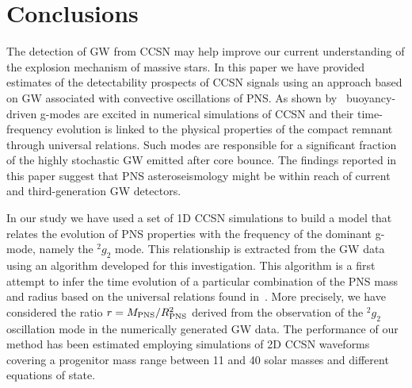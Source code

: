 \section{Conclusions}
\label{sec:conclusion}

The detection of GW from CCSN may help improve our current understanding of the explosion mechanism of massive stars.  
In this paper we have provided estimates of the detectability prospects of CCSN signals using an approach based on GW associated with convective oscillations of PNS. As shown by~\cite{Torres:2019b} buoyancy-driven g-modes are excited in numerical simulations of CCSN and their time-frequency evolution is linked to the physical properties of the compact remnant through universal relations. Such modes are responsible for a significant fraction of the highly stochastic GW emitted after core bounce. The findings reported in this paper suggest that PNS asteroseismology might be within reach of current and third-generation GW detectors.

In our study we have used a set of 1D CCSN simulations to build a model that relates the  evolution of PNS properties with the frequency of the dominant g-mode, namely the $\mbox{}^2g_2$ mode. This relationship is extracted from the GW data using an algorithm developed for this investigation. This algorithm is  a first attempt to infer the time evolution of a particular combination of the PNS mass and radius based on the universal relations found in~\cite{Torres:2019b}. More precisely, we have considered the ratio $r=M_{\rm PNS}/R_{\rm PNS}^2$ derived from the observation of the $\mbox{}^2g_2$ oscillation mode in the numerically generated GW data. The  performance of our method has been estimated employing  simulations of 2D CCSN waveforms covering a progenitor mass range between 11 and 40 solar masses and different equations of state. 

